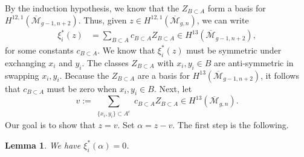 \documentclass[12pt]{amsart}
\newtheorem{lem}[thm]{Lemma}
\theoremstyle{definition}
\numberwithin{equation}{section}
\newcommand{\M}{\mathcal{M}}
\newcommand{\Mb}{\overline{\M}}
\theoremstyle{definition} %
\theoremstyle{remark}
\begin{document}
By the induction hypothesis, we know that the $Z_{B \subset A}$ form a basis for $H^{12,1}(\Mb_{g-1,n+2})$. Thus, given $z \in H^{12,1}(\Mb_{g,n})$, we can write
\begin{align} \label{heyo}
\xi_i^*(z) &= \sum_{B \subset A} c_{B \subset A} Z_{B \subset A} \in H^{13}(\Mb_{g-1,n+2}),
\end{align}
for some constants $c_{B \subset A}$.
We know that $\xi_i^*(z)$ must be 
symmetric under exchanging $x_i$ and $y_i$. The classes $Z_{B \subset A}$ with $x_i, y_i \in B$ are anti-symmetric in swapping $x_i, y_i$. Because the $Z_{B \subset A}$ are a basis for $H^{13}(\Mb_{g-1,n+2})$, it follows that
$c_{B \subset A}$ must be zero when $x_i, y_i \in B$. Next, let
\begin{equation} \label{vdef} v := \sum_{\substack{\{x_i, y_i\} \subset A^c}} c_{B \subset A} Z_{B \subset A} \in H^{13}(\Mb_{g,n}).
\end{equation}
Our goal is to show that $z = v$. 
Set $\alpha = z - v$.
The first step is the following.
\begin{lem} \label{firststep}
We have $\xi_i^*(\alpha) = 0$.
\end{lem}
\end{document}
